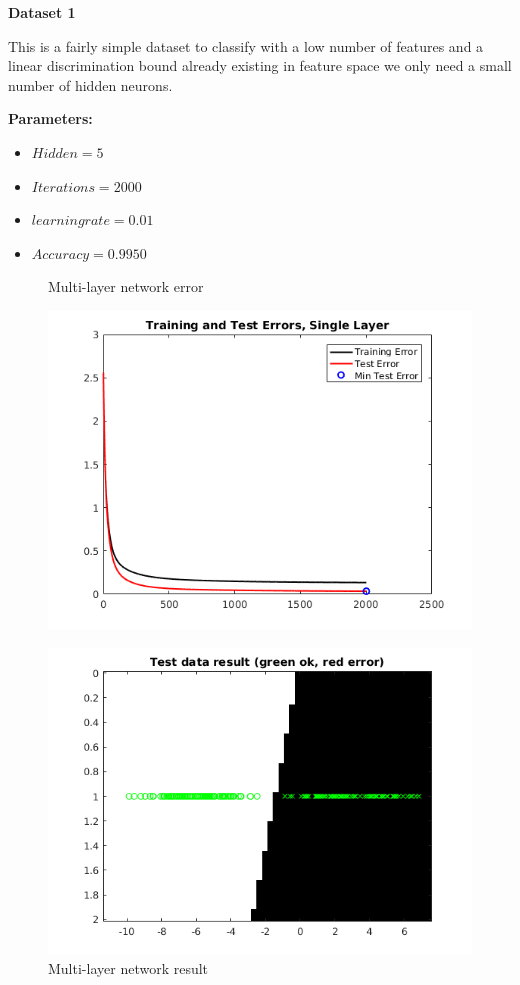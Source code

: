 \documentclass[a4paper,12pt]{article}
\begin{document}
\noindent \textbf{Dataset 1}

This is a fairly simple dataset to classify with a low number of features and a linear discrimination bound already existing in feature space we only need a small number of hidden neurons.

\textbf{Parameters:}
\begin{itemize}
\item $Hidden = 5$
\item $Iterations = 2000$
\item $learning rate = 0.01$
\item $Accuracy = 0.9950$
\end{itemize}

\begin{figure}[H]
\centering
  \begin{minipage}[]{0.49\textwidth}
  \caption{Multi-layer network error}\label{fig:multi_1_error}
  \includegraphics[width=\textwidth]{figures/multi_1_error.png}
  \end{minipage}
  \begin{minipage}[]{0.49\textwidth}
  \caption{Multi-layer network result}\label{fig:multi_1_test}
  \includegraphics[width=\textwidth]{figures/multi_1_test.png}
  \end{minipage}
\end{figure}
\end{document}
